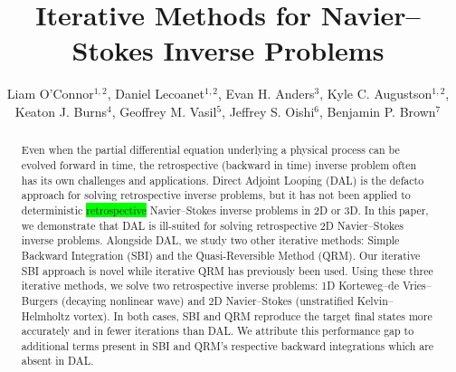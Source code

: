 \documentclass[%
 reprint,
 amsmath,amssymb,
 aps,
 pre,
]{revtex4-2}
\begin{document}

\title{Iterative Methods for Navier--Stokes Inverse Problems}

\author{Liam O'Connor$^{1,2}$, Daniel Lecoanet$^{1,2}$, Evan H. Anders$^{3}$, Kyle C. Augustson$^{1,2}$, Keaton J. Burns$^{4}$, Geoffrey M. Vasil$^{5}$, Jeffrey S. Oishi$^{6}$, Benjamin P. Brown$^{7}$}

\address{$^1$Department of Engineering Sciences and Applied Mathematics, Northwestern University, Evanston, IL, 60208 USA}
\address{$^2$Center for Interdisciplinary Exploration and Research in Astrophysics, Northwestern University, Evanston, IL, 60201 USA}
\address{$^3$Kavli Institute for Theoretical Physics, University of California Santa Barbara, Santa Barbara, CA, 93106 USA}
\address{$^4$Department of Mathematics, Massachusetts Institute of Technology, Cambridge, MA, 02142 USA}
\address{$^5$School of Mathematics, Edinburgh University, EH9 3FD, UK}
\address{$^6$Department of Physics and Astronomy, Bates College, Lewiston, ME, 04240 USA}
\address{$^7$Department of Astrophysical and Planetary Sciences, University of Colorado Boulder, Boulder, CO, 80309 USA}

\begin{abstract}
  Even when the partial differential equation underlying a physical process can be evolved forward in time, the retrospective (backward in time) inverse problem often has its own challenges and applications.
  Direct Adjoint Looping (DAL) is the defacto approach for solving retrospective inverse problems, but it has not been applied to deterministic \colorbox{lime}{retrospective} Navier--Stokes inverse problems in 2D or 3D.
  In this paper, we demonstrate that DAL is ill-suited for solving retrospective 2D Navier--Stokes inverse problems. 
  Alongside DAL, we study two other iterative methods: Simple Backward Integration (SBI) and the Quasi-Reversible Method (QRM).
  Our iterative SBI approach is novel while iterative QRM has previously been used.
  Using these three iterative methods, we solve two retrospective inverse problems:
  1D Korteweg--de Vries--Burgers (decaying nonlinear wave) and 2D Navier--Stokes (unstratified Kelvin--Helmholtz vortex).
  In both cases, SBI and QRM reproduce the target final states more accurately and in fewer iterations than DAL.
  We attribute this performance gap to additional terms present in SBI and QRM's respective backward integrations which are absent in DAL.
\end{abstract}
\end{document}

